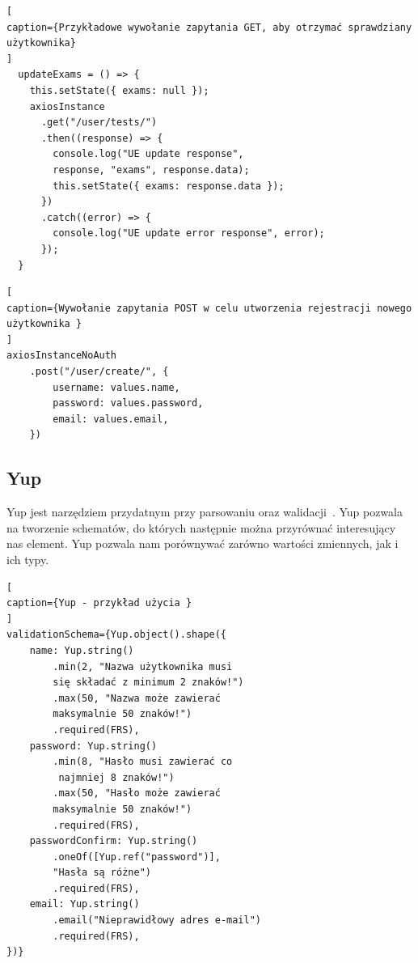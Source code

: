 \documentclass[oneside,polski,logo,indent]{amuthesis}
\begin{document}
\begin{lstlisting}[
caption={Przykładowe wywołanie zapytania GET, aby otrzymać sprawdziany użytkownika}
]
  updateExams = () => {
    this.setState({ exams: null });
    axiosInstance
      .get("/user/tests/")
      .then((response) => {
        console.log("UE update response",
        response, "exams", response.data);
        this.setState({ exams: response.data });
      })
      .catch((error) => {
        console.log("UE update error response", error);
      });
  }
\end{lstlisting}
\begin{lstlisting}[
caption={Wywołanie zapytania POST w celu utworzenia rejestracji nowego użytkownika }
]
axiosInstanceNoAuth
	.post("/user/create/", {
		username: values.name,
		password: values.password,
		email: values.email,
	})
\end{lstlisting}
\subsection{Yup}
Yup jest narzędziem przydatnym przy parsowaniu oraz walidacji~\cite{yup}. Yup pozwala na tworzenie schematów, do których następnie
można przyrównać interesujący nas element. Yup pozwala nam porównywać zarówno wartości zmiennych, jak i ich typy.
\begin{lstlisting}[
caption={Yup - przykład użycia }
]
validationSchema={Yup.object().shape({
	name: Yup.string()
		.min(2, "Nazwa użytkownika musi 
		się składać z minimum 2 znaków!")
		.max(50, "Nazwa może zawierać 
		maksymalnie 50 znaków!")
		.required(FRS),
	password: Yup.string()
		.min(8, "Hasło musi zawierać co
		 najmniej 8 znaków!")
		.max(50, "Hasło może zawierać 
		maksymalnie 50 znaków!")
		.required(FRS),
	passwordConfirm: Yup.string()
		.oneOf([Yup.ref("password")], 
		"Hasła są różne")
		.required(FRS),
	email: Yup.string()
		.email("Nieprawidłowy adres e-mail")
		.required(FRS),
})}
\end{lstlisting}
\end{document}
